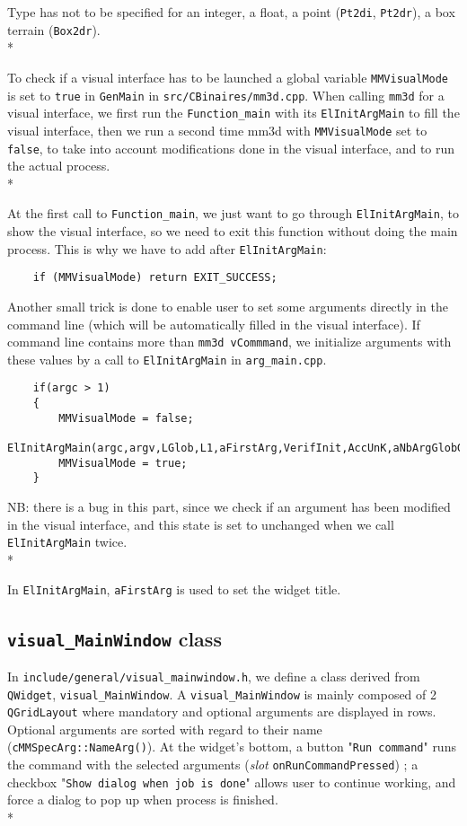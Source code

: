 \documentclass[a4paper]{book}
\begin{document}
Type has not to be specified for an integer, a float, a point ({\tt Pt2di}, {\tt Pt2dr}), a box terrain ({\tt Box2dr}).\\*

To check if a visual interface has to be launched a global variable {\tt MMVisualMode} is set to {\tt true} in {\tt GenMain} in {\tt src/CBinaires/mm3d.cpp}. When calling {\tt mm3d} for a visual interface, we first run the {\tt Function\_main} with its {\tt ElInitArgMain} to fill the visual interface, then we run a second time mm3d with {\tt MMVisualMode} set to {\tt false}, to take into account modifications done in the visual interface, and to run the actual process.\\*

At the first call to {\tt Function\_main}, we just want to go through {\tt ElInitArgMain}, to show the visual interface, so we need to exit this function without doing the main process. This is why we have to add after {\tt ElInitArgMain}:

\begin{verbatim}           
    if (MMVisualMode) return EXIT_SUCCESS;
\end{verbatim}

Another small trick is done to enable user to set some arguments directly in the command line (which will be automatically filled in the visual interface). If command line contains more than {\tt mm3d vCommmand}, we initialize arguments with these values by a call to {\tt ElInitArgMain} in {\tt arg\_main.cpp}.

\begin{verbatim} 
    if(argc > 1)
    {
    	MMVisualMode = false;
    	ElInitArgMain(argc,argv,LGlob,L1,aFirstArg,VerifInit,AccUnK,aNbArgGlobGlob);
    	MMVisualMode = true;
    }
\end{verbatim}
        
NB: there is a bug in this part, since we check if an argument has been modified in the visual interface, and this state is set to unchanged when we call {\tt ElInitArgMain} twice.\\*

In {\tt ElInitArgMain}, {\tt aFirstArg} is used to set the widget title.

\subsection{{\tt visual\_MainWindow} class}

In {\tt include/general/visual\_mainwindow.h}, we define a class derived from {\tt QWidget}, {\tt visual\_MainWindow}. A {\tt visual\_MainWindow} is mainly composed of 2 {\tt QGridLayout} where mandatory and optional arguments are displayed in rows. Optional arguments are sorted with regard to their name ({\tt cMMSpecArg::NameArg()}). At the widget's bottom, a button "{\tt Run command}" runs the command with the selected arguments (\textit{slot} {\tt onRunCommandPressed}) ; a checkbox "{\tt Show dialog when job is done}" allows user to continue working, and force a dialog to pop up when process is finished.\\*
\end{document}
